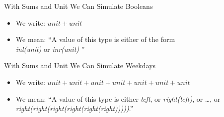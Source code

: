 \documentclass{beamer}
\begin{document}
\begin{frame}{With Sums and Unit We Can Simulate Booleans}

  \begin{itemize}
    \item We write: $unit + unit$
    \item We mean: ``A value of this type is either of the form \\
          \emph{inl(unit)} or \emph{inr(unit)} ''
  \end{itemize}

  \begin{center}
  \end{center}

\end{frame}


\begin{frame}{With Sums and Unit We Can Simulate Weekdays}

  \begin{itemize}
    \item We write: $unit + unit + unit + unit + unit + unit + unit$
    \item We mean: ``A value of this type is either \emph{left}, or
    \emph{right(left)}, or \ldots, or \emph{right(right(right(right(right(right)))))}.''
  \end{itemize}

  \begin{center}
  \end{center}

\end{frame}
\end{document}
